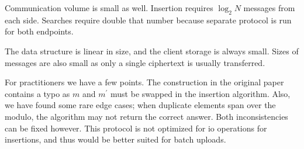 		Communication volume is small as well.
		Insertion requires $\log_2 N$ messages from each side.
		Searches require double that number because separate protocol is run for both endpoints.

		The data structure is linear in size, and the client storage is always small.
		Sizes of messages are also small as only a single ciphertext is usually transferred.

		For practitioners we have a few points.
		The construction in the original paper \cite{florian-protocol} contains a typo as $m$ and $m^\prime$ must be swapped in the insertion algorithm.
		Also, we have found some rare edge cases; when duplicate elements span over the modulo, the algorithm may not return the correct answer.
		Both inconsistencies can be fixed however.
		This protocol is not optimized for \acrshort{io} operations for insertions, and thus would be better suited for batch uploads.
